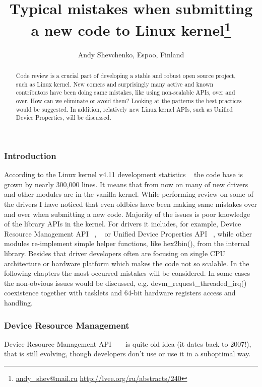 \documentclass[10pt, a5paper]{article}
\begin{document}
\title{Typical mistakes when submitting a new code to Linux kernel\footnote{\url{andy_shev@mail.ru} \url{http://lvee.org/ru/abstracts/240}}}
\author{Andy Shevchenko, Espoo, Finland}
\maketitle
\begin{abstract}
Code review is a crucial part of developing a stable and robust open source project, such as Linux kernel. New comers and surprisingly many active and known contributors have been doing same mistakes, like using non-scalable APIs, over and over. How can we eliminate or avoid them? Looking at the patterns the best practices would be suggested. In addition, relatively new Linux kernel APIs, such as Unified Device Properties, will be discussed.
\end{abstract}
\subsubsection*{Introduction}

According to the Linux kernel v4.11 development statistics ~\cite{Shevchenko1} the code base is grown by nearly 300,000 lines. It means that from now on many of new drivers and other modules are in the vanilla kernel. While performing review on some of the drivers I have noticed that even oldbies have been making same mistakes over and over when submitting a new code. Majority of the issues is poor knowledge of the library APIs in the kernel. For drivers it includes, for example, Device Resource Management API ~\cite{Shevchenko2}, ~\cite{Shevchenko3} or Unified Device Properties API ~\cite{Shevchenko4}, while other modules re-implement simple helper functions, like hex2bin(), from the internal library. Besides that driver developers often are focusing on single CPU architecture or hardware platform which makes the code not so scalable. In the following chapters the most occurred mistakes will be considered. In some cases the non-obvious issues would be discussed, e.g. devm\_request\_threaded\_irq() coexistence together with tasklets and 64-bit hardware registers access and handling.

\subsubsection*{Device Resource Management}

Device Resource Management API ~\cite{Shevchenko2} ~\cite{Shevchenko3} is quite old idea (it dates back to 2007!), that is still evolving, though developers don’t use or use it in a suboptimal way.
\end{document}
